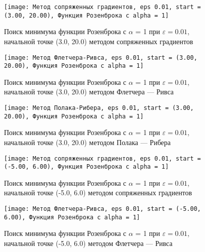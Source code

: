             \begin{figure}[H]
	        \centering
	        \texttt{[image: Метод сопряженных градиентов, eps 0.01, start = (3.00, 20.00), Функция Розенброка с alpha = 1]}%
	        \caption{Поиск минимума функции Розенброка с $\alpha$ = 1 при $\varepsilon = 0.01$, начальной точке (3.0, 20.0) методом сопряженных градиентов}
	        \vspace*{-1.2cm}
            \end{figure}
            
            \begin{figure}[H]
	        \centering
	        \texttt{[image: Метод Флетчера-Ривса, eps 0.01, start = (3.00, 20.00), Функция Розенброка с alpha = 1]}%
	        \caption{Поиск минимума функции Розенброка с $\alpha$ = 1 при $\varepsilon = 0.01$, начальной точке (3.0, 20.0) методом Флетчера --- Ривса}
	        \vspace*{-1.2cm}
            \end{figure}
            
            \begin{figure}[H]
	        \centering
	        \texttt{[image: Метод Полака-Рибера, eps 0.01, start = (3.00, 20.00), Функция Розенброка с alpha = 1]}%
	        \caption{Поиск минимума функции Розенброка с $\alpha$ = 1 при $\varepsilon = 0.01$, начальной точке (3.0, 20.0) методом Полака --- Рибера}
	        \vspace*{-1.2cm}
            \end{figure}
            
            \begin{figure}[H]
	        \centering
	        \texttt{[image: Метод сопряженных градиентов, eps 0.01, start = (-5.00, 6.00), Функция Розенброка с alpha = 1]}%
	        \caption{Поиск минимума функции Розенброка с $\alpha$ = 1 при $\varepsilon = 0.01$, начальной точке (-5.0, 6.0) методом сопряженных градиентов}
	        \vspace*{-1.2cm}
            \end{figure}
            
            \begin{figure}[H]
	        \centering
	        \texttt{[image: Метод Флетчера-Ривса, eps 0.01, start = (-5.00, 6.00), Функция Розенброка с alpha = 1]}%
	        \caption{Поиск минимума функции Розенброка с $\alpha$ = 1 при $\varepsilon = 0.01$, начальной точке (-5.0, 6.0) методом Флетчера --- Ривса}
	        \vspace*{-1.2cm}
            \end{figure}
            
